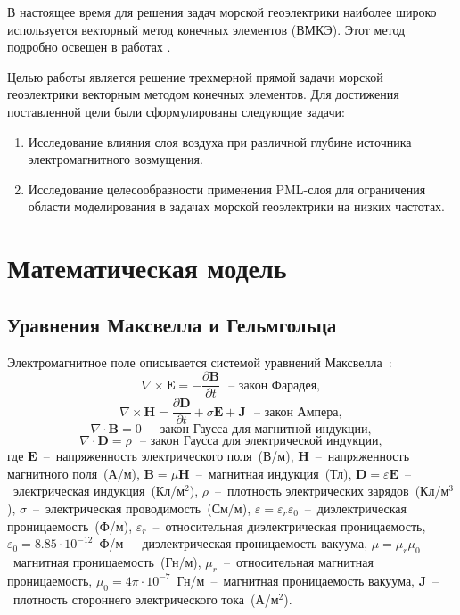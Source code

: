 \documentclass[a4paper,12pt]{article}
\makeatletter
\newcommand{\labelname}[1]{%
	\def\@currentlabelname{#1}}%
\makeatother
\begin{document}
В настоящее время для решения задач морской геоэлектрики наиболее широко используется векторный метод конечных элементов (ВМКЭ). Этот метод подробно освещен в работах \citep{balandin_vfem, monk}.

Целью работы является решение трехмерной прямой задачи морской геоэлектрики векторным методом конечных элементов. Для достижения поставленной цели были сформулированы следующие задачи:
\begin{enumerate}
	\item Исследование влияния слоя воздуха при различной глубине источника электромагнитного возмущения.
	\item Исследование целесообразности применения PML-слоя для ограничения области моделирования в задачах морской геоэлектрики на низких частотах.
\end{enumerate}


\clearpage
\section{Математическая модель}
\labelname{1}\label{sec:math_model}
\subsection{Уравнения Максвелла и Гельмгольца}
Электромагнитное поле описывается системой уравнений Максвелла~\citep{epov}:
\begin{equation}
	\nabla \times \mathbf{E} = - \frac{ \partial \mathbf{B} }{ \partial t } \text{~~--~закон Фарадея}, \label{eq:maxwell:faradey}
\end{equation}
\begin{equation}
	\nabla \times \mathbf{H} = \frac{ \partial \mathbf{D} }{ \partial t } + \sigma \mathbf{E} + \mathbf{J} \text{~~--~закон Ампера}, \label{eq:maxwell:amper}
\end{equation}
\begin{equation*}
	\nabla \cdot \mathbf{B} = 0 \text{~~--~закон Гаусса для магнитной индукции}, \label{eq:maxwell:gauss_magn}
\end{equation*}
\begin{equation*}
	\nabla \cdot \mathbf{D} = \rho \text{~~--~закон Гаусса для электрической индукции}, \label{eq:maxwell:gauss_elect}
\end{equation*}
где $\mathbf{E}$~--~напряженность электрического поля~(В/м), $\mathbf{H}$~--~напряженность магнитного поля~(А/м), $\mathbf{B}=\mu \mathbf{H}$~--~магнитная индукция~(Тл), $\mathbf{D}=\varepsilon \mathbf{E}$~--~электрическая индукция~(Кл/м${}^2$), $\rho$~--~плотность электрических зарядов~(Кл/м${}^3$), $\sigma$~--~электрическая проводимость~(См/м), $\varepsilon = \varepsilon_r \varepsilon_0$~--~диэлектрическая проницаемость~(Ф/м), $\varepsilon_r$~--~относительная диэлектрическая проницаемость, $\varepsilon_0 = 8.85 \cdot 10^{-12}$~Ф/м~--~диэлектрическая проницаемость вакуума, $\mu = \mu_r \mu_0$~--~магнитная проницаемость~(Гн/м), $\mu_r$~--~относительная магнитная проницаемость, $\mu_0 = 4 \pi \cdot 10^{-7}$~Гн/м~--~магнитная проницаемость вакуума, $\mathbf{J}$~--~плотность стороннего электрического тока~(А/м${}^2$).
\end{document}
